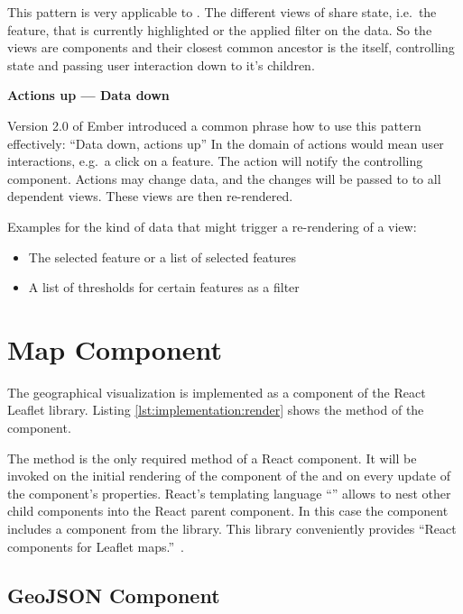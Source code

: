 This pattern is very applicable to \cmvs{}.
The different views of \cmvs{} share state, i.e.\ the feature, that is currently highlighted or the applied filter on the data.
So the views are components and their closest common ancestor is the \cmv{} itself, controlling state and passing user interaction down to it's children.

\textbf{Actions up --- Data down}

Version 2.0 of Ember introduced a common phrase how to use this pattern effectively: ``Data down, actions up''\cite{Emberigniter2017}
In the domain of \cmvs{} actions would mean user interactions, e.g.\ a click on a feature.
The action will notify the controlling \cmv{} component.
Actions may change data, and the changes will be passed to to all dependent views.
These views are then re-rendered.

Examples for the kind of data that might trigger a re-rendering of a view:
\begin{itemize}
  \item
    The selected feature or a list of selected features
  \item
    A list of thresholds for certain features as a filter
\end{itemize}


\section{Map Component}

The geographical visualization is implemented as a  component of the React Leaflet library.
Listing \ref{lst:implementation:render} shows the  method of the component.



The  method is the only required method of a React component.
It will be invoked on the initial rendering of the component of the  and on every update of the component's properties.
React's templating language ``'' allows to nest other child components into the React parent component.
In this case the  component includes a   component from the  library.
This library conveniently provides ``React components for Leaflet maps.''~\cite{ReactLeaflet2017}.

\subsection{GeoJSON Component}

